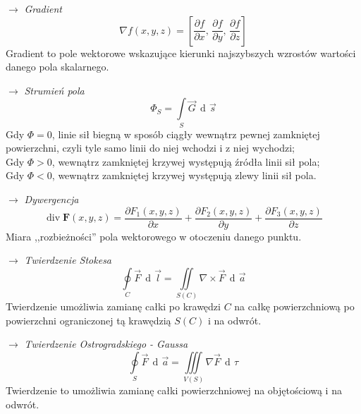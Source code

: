\documentclass[12pt]{article}
\newenvironment{wzor}[1]{\par{\Large $\longrightarrow$ \textit{#1}}}
    {\newline {\color{grey} \rule{\linewidth}{0.3pt}}}
\DeclareMathOperator{\der}{\operatorname{d}\!}
\begin{document}

\begin{wzor}{Gradient}
    \begin{equation}
        \nabla f(x,y,z) = \left[
                \frac{\partial f}{\partial x},\,
                \frac{\partial f}{\partial y},\,
                \frac{\partial f}{\partial z}
        \right]
    \end{equation}
    Gradient to pole wektorowe wskazujące kierunki najszybszych wzrostów wartości
    danego pola skalarnego.
\end{wzor}

\begin{wzor}{Strumień pola}
    \begin{equation}
        \Phi_S = \int\limits_S \Vec{G} \, \der \Vec{s}
    \end{equation}
    Gdy $\Phi = 0$, linie sił biegną w sposób ciągły wewnątrz pewnej zamkniętej powierzchni,
    czyli tyle samo linii do niej wchodzi i z niej wychodzi;\\
    Gdy $\Phi > 0$, wewnątrz zamkniętej krzywej występują źródła linii sił pola;\\
    Gdy $\Phi < 0$, wewnątrz zamkniętej krzywej występują zlewy linii sił pola.
\end{wzor}

\begin{wzor}{Dywergencja}
    \begin{equation}
        \operatorname{div} \mathbf{F}(x,y,z) = \frac{\partial F_1(x,y,z)}{\partial x}
                + \frac{\partial F_2(x,y,z)}{\partial y}
                + \frac{\partial F_3(x,y,z)}{\partial z}
    \end{equation}
    Miara ,,rozbieżności'' pola wektorowego w otoczeniu danego punktu.
\end{wzor}

\begin{wzor}{Twierdzenie Stokesa}
    \begin{equation}
        \oint\limits_C \Vec{F}\,\der \Vec{l}
            = \iint\limits_{S(C)} \nabla \times \Vec{F}\,\der\Vec{a} 
    \end{equation}
    Twierdzenie umożliwia zamianę całki po krawędzi $C$ na całkę powierzchniową po powierzchni
    ograniczonej tą krawędzią $S(C)$ i na odwrót.
\end{wzor}

\begin{wzor}{Twierdzenie Ostrogradskiego - Gaussa}
    \begin{equation}
        \oint\limits_S \Vec{F} \, \der \Vec{a} = \iiint\limits_{V(S)} \nabla \Vec{F} \, \der\tau
    \end{equation}
    Twierdzenie to umożliwia zamianę całki powierzchniowej na objętościową i na odwrót.
\end{wzor}
\end{document}
